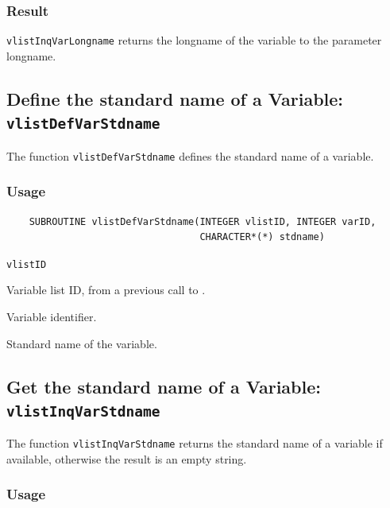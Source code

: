 \subsubsection*{Result}

{\texttt{vlistInqVarLongname}} returns the longname of the variable to the parameter longname.



\subsection{Define the standard name of a Variable: \texttt{vlistDefVarStdname}}
\label{vlistDefVarStdname}

The function {\texttt{vlistDefVarStdname}} defines the standard name of a variable.

\subsubsection*{Usage}

\begin{verbatim}
    SUBROUTINE vlistDefVarStdname(INTEGER vlistID, INTEGER varID, 
                                  CHARACTER*(*) stdname)
\end{verbatim}

\hspace*{4mm}\begin{minipage}[]{15cm}
\begin{deflist}{\texttt{vlistID}\ }
\item[\texttt{vlistID}]
Variable list ID, from a previous call to {}.
\item[\texttt{varID}]
Variable identifier.
\item[\texttt{stdname}]
Standard name of the variable.

\end{deflist}
\end{minipage}


\subsection{Get the standard name of a Variable: \texttt{vlistInqVarStdname}}
\label{vlistInqVarStdname}

The function {\texttt{vlistInqVarStdname}} returns the standard name of a variable if available,
otherwise the result is an empty string.

\subsubsection*{Usage}

